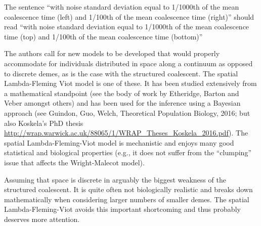 


\begin{point}{}
    The sentence ``with noise standard deviation equal to 1/1000th of the mean
    coalescence time (left) and 1/100th of the mean coalescence time (right)''
    should read ``with noise standard deviation equal to 1/1000th of the mean
    coalescence time (top) and 1/100th of the mean coalescence time (bottom)''
\end{point}




\begin{point}{}
    The authors call for new models to be developed that would properly accommodate
    for individuals distributed in space along a continuum as opposed to
    discrete demes, as is the case with the structured coalescent. The spatial
    Lambda-Fleming Viot model is one of these. It has been studied extensively
    from a mathematical standpoint (see the body of work by Etheridge, Barton
    and Veber amongst others) and has been used for the inference using a
    Bayesian approach (see Guindon, Guo, Welch, Theoretical Population Biology,
    2016; but also Koskela's PhD thesis
    \url{http://wrap.warwick.ac.uk/88065/1/WRAP_Theses_Koskela_2016.pdf}).  The
    spatial Lambda-Fleming-Viot model is mechanistic and enjoys many good
    statistical and biological properties (e.g., it does not suffer from the
    ``clumping'' issue that affects the Wright-Malecot model).
\end{point}


\begin{point}{}
    Assuming that space is discrete in arguably the biggest weakness of the structured
    coalescent. It is quite often not biologically realistic and breaks down
    mathematically when considering larger numbers of smaller demes. The
    spatial Lambda-Fleming-Viot avoids this important shortcoming and thus
    probably deserves more attention.
\end{point}


